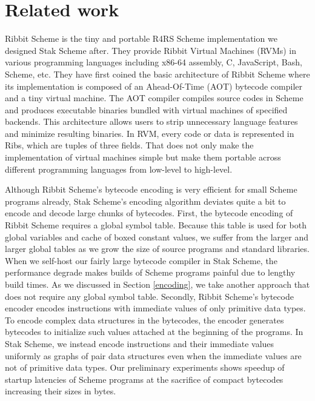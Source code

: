 \documentclass[sigplan, anonymous, review]{acmart}
\begin{document}
\section{Related work}

Ribbit Scheme \cite{ribbit2023} is the tiny and portable R4RS Scheme
implementation we designed Stak Scheme after. They provide
Ribbit Virtual Machines (RVMs) in various programming languages
including x86-64 assembly, C, JavaScript, Bash, Scheme, etc.
They have first coined the basic architecture of Ribbit Scheme
\cite{ribbit2021} where its implementation is composed of an
Ahead-Of-Time (AOT) bytecode compiler and a tiny virtual machine.
The AOT compiler compiles source codes in Scheme and produces
executable binaries bundled with virtual machines of specified backends.
This architecture allows users to strip unnecessary language
features and minimize resulting binaries.
In RVM, every code or data is represented in
Ribs, which are tuples of three fields.
That does not only make the implementation of
virtual machines simple but make them portable across different
programming languages from low-level to high-level.

Although Ribbit Scheme's bytecode encoding is very efficient
for small Scheme programs already,
Stak Scheme's encoding algorithm deviates quite a bit to encode and decode
large chunks of bytecodes.
First, the bytecode encoding of Ribbit Scheme requires a global symbol table.
Because this table is used for both global variables and cache of
boxed constant values, we suffer from the larger and larger global tables
as we grow the size of source programs and standard libraries.
When we self-host our fairly large bytecode compiler in Stak Scheme,
the performance degrade makes builds of Scheme programs painful due
to lengthy build times.
As we discussed in Section \ref{encoding}, we take another approach that
does not require any global symbol table.
Secondly, Ribbit Scheme's bytecode encoder encodes instructions
with immediate values of only primitive data types.
To encode complex data structures in the bytecodes, the encoder
generates bytecodes to initialize such values attached at the
beginning of the programs.
In Stak Scheme, we instead encode instructions and their immediate
values uniformly as graphs of pair data structures even when the
immediate values are not of primitive data types.
Our preliminary experiments shows speedup of startup
latencies of Scheme programs at the sacrifice of compact bytecodes
increasing their sizes in bytes.
\end{document}
